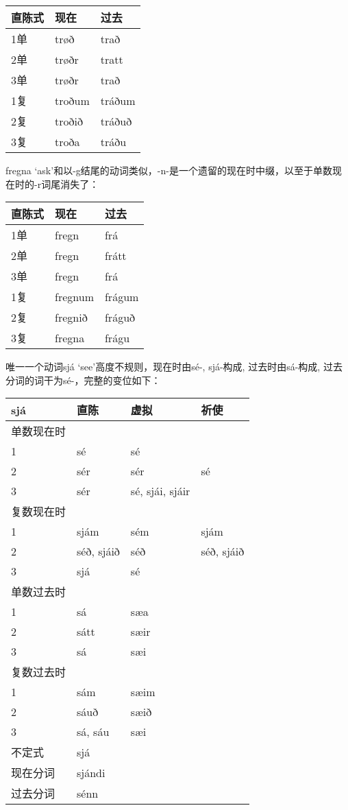 \begin{longtable}{lll}
\toprule
直陈式 & 现在 & 过去 \\
\midrule
\endhead
\bottomrule
\endfoot
1单 & trøð & trað \\
2单 & trøðr & tratt \\
3单 & trøðr & trað \\
1复 & troðum & tráðum \\
2复 & troðið & tráðuð \\
3复 & troða & tráðu \\
\end{longtable}

fregna
`ask'和以-g结尾的动词类似，-n-是一个遗留的现在时中缀，以至于单数现在时的-r词尾消失了：

\begin{longtable}{lll}
\toprule
直陈式 & 现在 & 过去 \\
\midrule
\endhead
\bottomrule
\endfoot
1单 & fregn & frá \\
2单 & fregn & frátt \\
3单 & fregn & frá \\
1复 & fregnum & frágum \\
2复 & fregnið & fráguð \\
3复 & fregna & frágu \\
\end{longtable}

唯一一个动词sjá `see‌'高度不规则，现在时由sé-, sjá-构成, 过去时由sá-构成,
过去分词的词干为sé-，完整的变位如下：

\begin{longtable}{llll}
\toprule
sjá & 直陈 & 虚拟 & 祈使 \\
\midrule
\endhead
\bottomrule
\endfoot
单数现在时 & & & \\
1 & sé & sé & \\
2 & sér & sér & sé \\
3 & sér & sé, sjái, sjáir & \\
复数现在时 & & & \\
1 & sjám & sém & sjám \\
2 & séð, sjáið & séð & séð, sjáið \\
3 & sjá & sé & \\
单数过去时 & & & \\
1 & sá & sæa & \\
2 & sátt & sæir & \\
3 & sá & sæi & \\
复数过去时 & & & \\
1 & sám & sæim & \\
2 & sáuð & sæið & \\
3 & sá, sáu & sæi & \\
不定式 & sjá & & \\
现在分词 & sjándi & & \\
过去分词 & sénn & & \\
\end{longtable}

